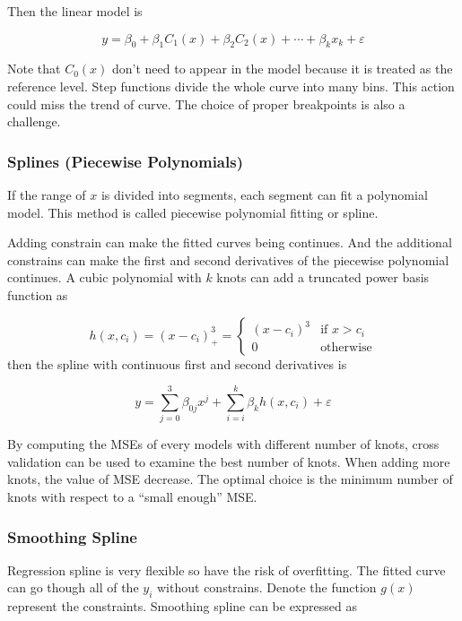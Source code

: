 \documentclass[
  11pt,
  openany]{memoir}
\begin{document}
Then the linear model is

\begin{equation}
y=\beta_0+\beta_1C_1(x)+\beta_2C_2(x)+\cdots+\beta_{k}x_k+\varepsilon
\label{eq:stepf}
\end{equation}

Note that \(C_0(x)\) don't need to appear in the model because it is treated as the reference level.
Step functions divide the whole curve into many bins. This action could miss the trend of curve.
The choice of proper breakpoints is also a challenge.

\hypertarget{splines-piecewise-polynomials}{%
\subsubsection{Splines (Piecewise Polynomials)}\label{splines-piecewise-polynomials}}

If the range of \(x\) is divided into segments, each segment can fit a polynomial model. This method is called piecewise polynomial fitting or spline.

Adding constrain can make the fitted curves being continues. And the additional constrains can make the first and second derivatives of the piecewise polynomial continues.
A cubic polynomial with \(k\) knots can add a truncated power basis function as

\[h(x,c_i)=(x-c_i)^3_+=\begin{cases}(x-c_i)^3&\text{if }x>c_i\\0&\text{otherwise}\end{cases}\]
then the spline with continuous first and second derivatives is

\[y=\sum_{j=0}^3\beta_{0j}x^j+\sum_{i=i}^k\beta_{k}h(x,c_i)+\varepsilon\]

By computing the MSEs of every models with different number of knots, cross validation can be used to examine the best number of knots.
When adding more knots, the value of MSE decrease. The optimal choice is the minimum number of knots with respect to a ``small enough'' MSE.

\hypertarget{smoothing-spline}{%
\subsubsection{Smoothing Spline}\label{smoothing-spline}}

Regression spline is very flexible so have the risk of overfitting. The fitted curve can go though all of the \(y_i\) without constrains. Denote the function \(g(x)\) represent the constraints. Smoothing spline can be expressed as
\end{document}
